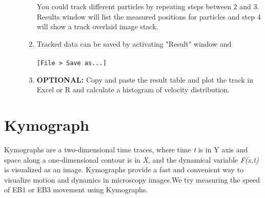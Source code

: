 \documentclass[11pnt]{article}
\begin{document}
\begin{description}
\begin{enumerate}
You could track different particles by repeating steps between 2 and 3. Results window will list the measured positions for particles and step 4 will show a track overlaid image stack.

\item Tracked data can be saved by activating "Result" window and 
\\
\\
\verb"[File > Save as...]"
\\
\item \textbf{OPTIONAL:} Copy and paste the result table and plot the track in Excel or R and calculate a histogram of velocity distribution.
\end{enumerate}

\end{description}

\section{Kymograph}

Kymographs are a two-dimensional time traces, where time \textit{t} is in Y axis and space along a one-dimensional contour is in \textit{X}, and the dynamical variable \textit{F(x,t) }is
visualized as an image. Kymographs provide a fast and convenient way to
visualize motion and dynamics in microscopy images.We try measuring the speed of EB1 or EB3 movement using Kymographs. 
\end{document}
